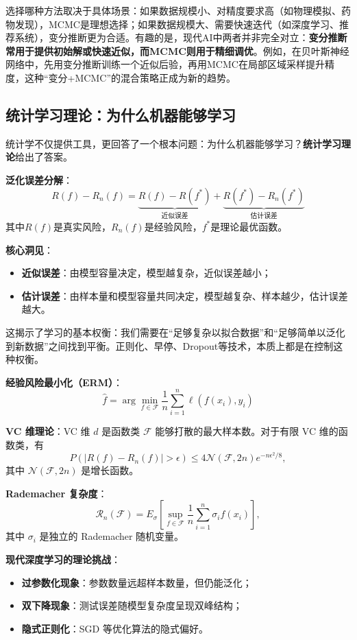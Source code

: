 选择哪种方法取决于具体场景：如果数据规模小、对精度要求高（如物理模拟、药物发现），MCMC是理想选择；如果数据规模大、需要快速迭代（如深度学习、推荐系统），变分推断更为合适。有趣的是，现代AI中两者并非完全对立：\textbf{变分推断常用于提供初始解或快速近似，而MCMC则用于精细调优}。例如，在贝叶斯神经网络中，先用变分推断训练一个近似后验，再用MCMC在局部区域采样提升精度，这种``变分+MCMC''的混合策略正成为新的趋势。

\subsection{统计学习理论：为什么机器能够学习}

统计学不仅提供工具，更回答了一个根本问题：为什么机器能够学习？\textbf{统计学习理论}给出了答案。

\textbf{泛化误差分解}：
\begin{equation}
R(f) - R_n(f) = \underbrace{R(f) - R(f^*)}_{\text{近似误差}} + \underbrace{R(f^*) - R_n(f^*)}_{\text{估计误差}}
\end{equation}
其中$R(f)$是真实风险，$R_n(f)$是经验风险，$f^*$是理论最优函数。

\textbf{核心洞见}：
\begin{itemize}
  \item \textbf{近似误差}：由模型容量决定，模型越复杂，近似误差越小；
  \item \textbf{估计误差}：由样本量和模型容量共同决定，模型越复杂、样本越少，估计误差越大。
\end{itemize}

这揭示了学习的基本权衡：我们需要在``足够复杂以拟合数据''和``足够简单以泛化到新数据''之间找到平衡。正则化、早停、Dropout等技术，本质上都是在控制这种权衡。

\textbf{经验风险最小化（ERM）}：
$$\hat{f} = \arg\min_{f \in \mathcal{F}} \frac{1}{n}\sum_{i=1}^n \ell(f(x_i), y_i)$$

\textbf{VC 维理论}：VC 维 $d$ 是函数类 $\mathcal{F}$ 能够打散的最大样本数。对于有限 VC 维的函数类，有
$$
P\left(|R(f) - R_n(f)| > \epsilon\right) \leq 4\mathcal{N}(\mathcal{F}, 2n)e^{-n\epsilon^2/8},
$$
其中 $\mathcal{N}(\mathcal{F}, 2n)$ 是增长函数。

\textbf{Rademacher 复杂度}：
$$
\mathcal{R}_n(\mathcal{F}) = E_{\sigma}\left[\sup_{f \in \mathcal{F}} \frac{1}{n}\sum_{i=1}^n \sigma_i f(x_i)\right],
$$
其中 $\sigma_i$ 是独立的 Rademacher 随机变量。

\textbf{现代深度学习的理论挑战}：
\begin{itemize}
  \item \textbf{过参数化现象}：参数数量远超样本数量，但仍能泛化；
  \item \textbf{双下降现象}：测试误差随模型复杂度呈现双峰结构；
  \item \textbf{隐式正则化}：SGD 等优化算法的隐式偏好。
\end{itemize}


